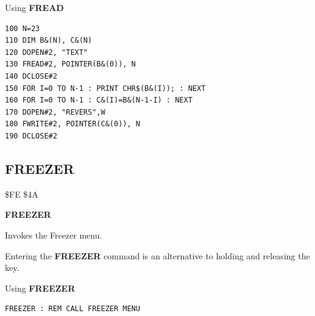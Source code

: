 \begin{description}[leftmargin=2cm,style=nextline]
\item [Example:]  Using {\bf FREAD}

\begin{tcolorbox}[colback=black,coltext=white]
\verbatimfont{\codefont}
\begin{verbatim}
100 N=23
110 DIM B&(N), C&(N)
120 DOPEN#2, "TEXT"
130 FREAD#2, POINTER(B&(0)), N
140 DCLOSE#2
150 FOR I=0 TO N-1 : PRINT CHR$(B&(I)); : NEXT
160 FOR I=0 TO N-1 : C&(I)=B&(N-1-I) : NEXT
170 DOPEN#2, "REVERS",W
180 FWRITE#2, POINTER(C&(0)), N
190 DCLOSE#2
\end{verbatim}
\end{tcolorbox}
\end{description}


\newpage
\subsection{FREEZER}
\begin{description}[leftmargin=2cm,style=nextline]
\item [Token:]    \$FE \$4A

\item [Format:]   {\bf FREEZER}

\item [Usage:]    Invokes the Freezer menu.

\item [Remarks:]  Entering the {\bf FREEZER} command is an alternative to holding and releasing the  key.

\item [Example:]  Using {\bf FREEZER}

\begin{tcolorbox}[colback=black,coltext=white]
\verbatimfont{\codefont}
\begin{verbatim}
FREEZER : REM CALL FREEZER MENU
\end{verbatim}
\end{tcolorbox}
\end{description}


\newpage
